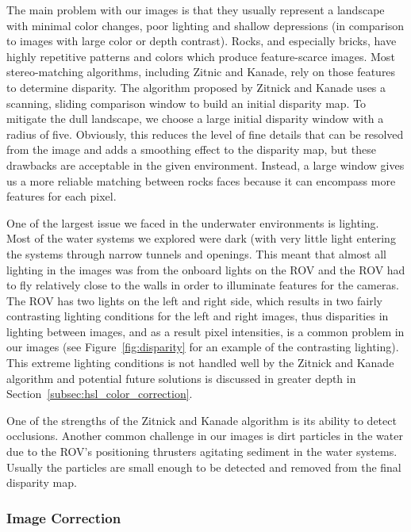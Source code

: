 \documentclass[a4paper,twoside]{article}
\begin{document}
The main problem with our images is that they usually represent a landscape with minimal color changes, poor lighting and shallow depressions (in comparison to images with large color or depth contrast).  
Rocks, and especially bricks, have highly repetitive patterns and colors which produce feature-scarce images.
Most stereo-matching algorithms, including Zitnic and Kanade, rely on those features to determine disparity.  
The algorithm proposed by Zitnick and Kanade uses a scanning, sliding comparison window to build an initial disparity map.  
To mitigate the dull landscape, we choose a large initial disparity window with a radius of five. 
Obviously, this reduces the level of fine details that can be resolved from the image and adds a smoothing effect to the disparity map, but these drawbacks are acceptable in the given environment.  
Instead, a large window gives us a more reliable matching between rocks faces because it can encompass more features for each pixel.  

One of the largest issue we faced in the underwater environments is lighting.  Most of the water systems we explored were dark (with very little light entering the systems through narrow tunnels and openings.  This meant that almost all lighting in the images was from the onboard lights on the ROV and the ROV had to fly relatively close to the walls in order to illuminate features for the cameras.  The ROV has two lights on the left and right side, which results in two fairly contrasting lighting conditions for the left and right images, thus disparities in lighting between images, and as a result pixel intensities, is a common problem in our images (see Figure~\ref{fig:disparity} for an example of the contrasting lighting).  This extreme lighting conditions is not handled well by the Zitnick and Kanade algorithm and potential future solutions is discussed in greater depth in Section~\ref{subsec:hsl_color_correction}.

One of the strengths of the Zitnick and Kanade algorithm is its ability to detect occlusions.  
Another common challenge in our images is dirt particles in the water due to the ROV's positioning thrusters agitating sediment in the water systems. Usually the particles are small enough to be detected and removed from the final disparity map.


\subsubsection{Image Correction}
\label{subsec:image_correction}
\end{document}
